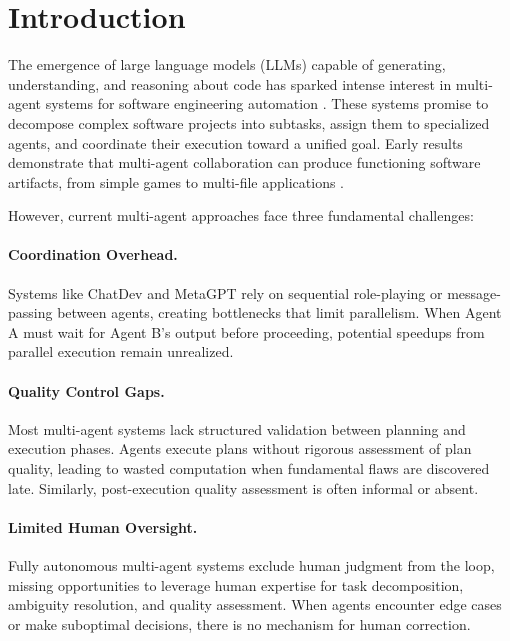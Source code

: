 \section{Introduction}
\label{sec:introduction}

The emergence of large language models (LLMs) capable of generating, understanding,
and reasoning about code has sparked intense interest in multi-agent systems for
software engineering automation \citep{li2023chatdev, hong2023metagpt}. These systems
promise to decompose complex software projects into subtasks, assign them to specialized
agents, and coordinate their execution toward a unified goal. Early results demonstrate
that multi-agent collaboration can produce functioning software artifacts, from simple
games to multi-file applications \citep{qian2023chatdev}.

However, current multi-agent approaches face three fundamental challenges:

\paragraph{Coordination Overhead.} Systems like ChatDev \citep{qian2023chatdev} and
MetaGPT \citep{hong2023metagpt} rely on sequential role-playing or message-passing
between agents, creating bottlenecks that limit parallelism. When Agent A must wait
for Agent B's output before proceeding, potential speedups from parallel execution
remain unrealized.

\paragraph{Quality Control Gaps.} Most multi-agent systems lack structured validation
between planning and execution phases. Agents execute plans without rigorous assessment
of plan quality, leading to wasted computation when fundamental flaws are discovered
late. Similarly, post-execution quality assessment is often informal or absent.

\paragraph{Limited Human Oversight.} Fully autonomous multi-agent systems exclude
human judgment from the loop, missing opportunities to leverage human expertise for
task decomposition, ambiguity resolution, and quality assessment. When agents
encounter edge cases or make suboptimal decisions, there is no mechanism for
human correction.

